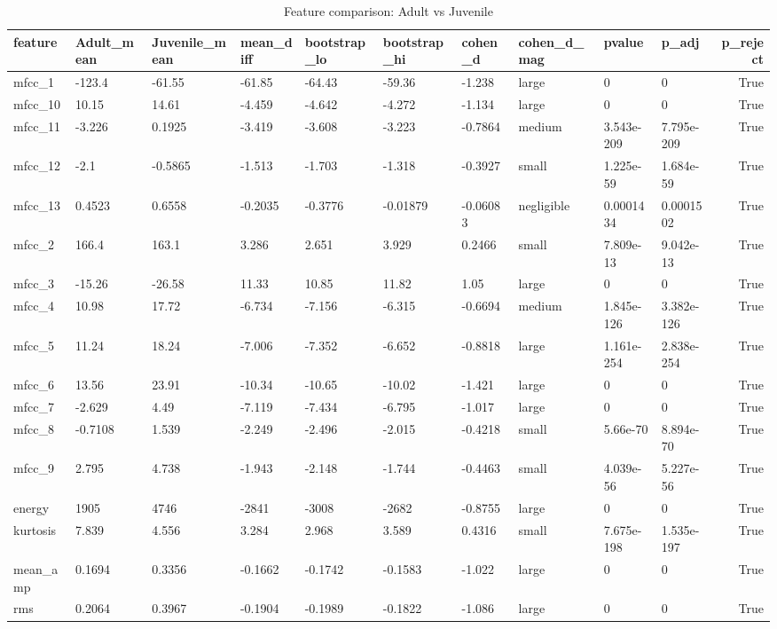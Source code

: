 \begin{table}
\caption{Feature comparison: Adult vs Juvenile}
\label{tab:adult_juvenile}
\begin{tabular}{llllllllllr}
\toprule
feature & Adult_mean & Juvenile_mean & mean_diff & bootstrap_lo & bootstrap_hi & cohen_d & cohen_d_mag & pvalue & p_adj & p_reject \\
\midrule
mfcc_1 & -123.4 & -61.55 & -61.85 & -64.43 & -59.36 & -1.238 & large & 0 & 0 & True \\
mfcc_10 & 10.15 & 14.61 & -4.459 & -4.642 & -4.272 & -1.134 & large & 0 & 0 & True \\
mfcc_11 & -3.226 & 0.1925 & -3.419 & -3.608 & -3.223 & -0.7864 & medium & 3.543e-209 & 7.795e-209 & True \\
mfcc_12 & -2.1 & -0.5865 & -1.513 & -1.703 & -1.318 & -0.3927 & small & 1.225e-59 & 1.684e-59 & True \\
mfcc_13 & 0.4523 & 0.6558 & -0.2035 & -0.3776 & -0.01879 & -0.06083 & negligible & 0.0001434 & 0.0001502 & True \\
mfcc_2 & 166.4 & 163.1 & 3.286 & 2.651 & 3.929 & 0.2466 & small & 7.809e-13 & 9.042e-13 & True \\
mfcc_3 & -15.26 & -26.58 & 11.33 & 10.85 & 11.82 & 1.05 & large & 0 & 0 & True \\
mfcc_4 & 10.98 & 17.72 & -6.734 & -7.156 & -6.315 & -0.6694 & medium & 1.845e-126 & 3.382e-126 & True \\
mfcc_5 & 11.24 & 18.24 & -7.006 & -7.352 & -6.652 & -0.8818 & large & 1.161e-254 & 2.838e-254 & True \\
mfcc_6 & 13.56 & 23.91 & -10.34 & -10.65 & -10.02 & -1.421 & large & 0 & 0 & True \\
mfcc_7 & -2.629 & 4.49 & -7.119 & -7.434 & -6.795 & -1.017 & large & 0 & 0 & True \\
mfcc_8 & -0.7108 & 1.539 & -2.249 & -2.496 & -2.015 & -0.4218 & small & 5.66e-70 & 8.894e-70 & True \\
mfcc_9 & 2.795 & 4.738 & -1.943 & -2.148 & -1.744 & -0.4463 & small & 4.039e-56 & 5.227e-56 & True \\
energy & 1905 & 4746 & -2841 & -3008 & -2682 & -0.8755 & large & 0 & 0 & True \\
kurtosis & 7.839 & 4.556 & 3.284 & 2.968 & 3.589 & 0.4316 & small & 7.675e-198 & 1.535e-197 & True \\
mean_amp & 0.1694 & 0.3356 & -0.1662 & -0.1742 & -0.1583 & -1.022 & large & 0 & 0 & True \\
rms & 0.2064 & 0.3967 & -0.1904 & -0.1989 & -0.1822 & -1.086 & large & 0 & 0 & True \\

\end{tabular}
\end{table}
